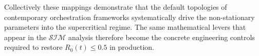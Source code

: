 Collectively these mappings demonstrate that the default topologies of contemporary orchestration frameworks systematically drive the non-stationary parameters into the supercritical regime. The same mathematical levers that appear in the \(\mathcal{S}\mathcal{I}\mathcal{M}\) analysis therefore become the concrete engineering controls required to restore \(R_0(t)\le 0.5\) in production.
